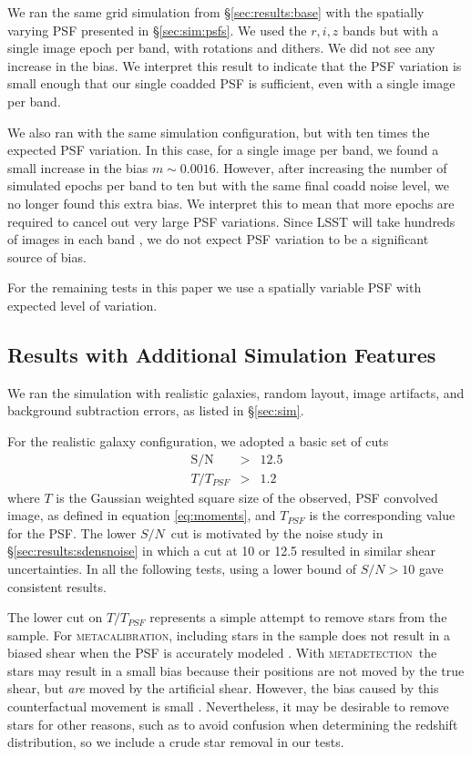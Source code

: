 \documentclass[twocolumn,twocolappendix,astrosym]{openjournal}
\newcommand{\snr}{$S/N$}
\newcommand{\mcal}{\textsc{metacalibration}}
\newcommand{\mdet}{\textsc{metadetection}}
\begin{document}
We ran the same grid simulation from \S \ref{sec:results:base} with the
spatially varying PSF presented in \S \ref{sec:sim:psfs}. We used the $r, i, z$
bands but with a single image epoch per band, with rotations and dithers.  We
did not see any increase in the bias.   We interpret this result to indicate
that the PSF variation is small enough that our single coadded PSF is
sufficient, even with a single image per band.

We also ran with the same simulation configuration, but with ten times the
expected PSF variation. In this case, for a single image per band, we found a
small increase in the bias $m \sim 0.0016$.  However, after increasing the
number of simulated epochs per band to ten but with the same final coadd noise
level, we no longer found this extra bias.  We interpret this to mean that more
epochs are required to cancel out very large PSF variations.  Since LSST will
take hundreds of images in each band \citep{IvezicLSST2008}, we do not
expect PSF variation to be a significant source of bias.

For the remaining tests in this paper we use a spatially variable PSF with
expected level of variation.

\subsection{Results with Additional Simulation Features} \label{sec:results:more}

We ran the simulation with realistic galaxies, random layout, image
artifacts, and background subtraction errors, as listed in \S \ref{sec:sim}.

For the realistic galaxy configuration, we adopted a basic set of cuts
\begin{eqnarray} \label{eq:basiccuts}
    \mathrm{S/N} & > & 12.5 \\
    T/T_{PSF} & > & 1.2
\end{eqnarray}
where $T$ is the Gaussian weighted square size of the observed, PSF convolved
image, as defined in equation \ref{eq:moments}, and $T_{PSF}$ is the
corresponding value for the PSF.  The lower \snr\ cut is motivated by the noise
study in \S \ref{sec:results:sdensnoise} in which a cut at 10 or 12.5 resulted
in similar shear uncertainties.  In all the following tests, using a lower
bound of $S/N > 10$ gave consistent results.

The lower cut on $T/T_{PSF}$ represents a simple attempt to remove stars from
the sample.  For \mcal, including stars in the sample does not result in a
biased shear when the PSF is accurately modeled \citep{SheldonMcal2017}.  With
\mdet\ the stars may result in a small bias because their positions are not
moved by the true shear, but {\it are} moved by the artificial shear. However,
the bias caused by this counterfactual movement is small \citep{mdet20}.
Nevertheless, it may be desirable to remove stars for other reasons, such as to
avoid confusion when determining the redshift distribution, so we include a
crude star removal in our tests.
\end{document}
